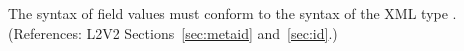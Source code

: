 The syntax of  field values must conform to the syntax of the
XML type .  (References: L2V2 Sections~\ref{sec:metaid}
and~\ref{sec:id}.)
